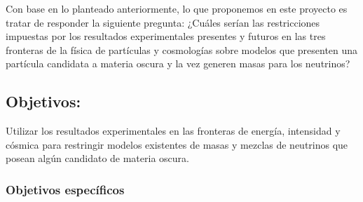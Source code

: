 Con base en lo planteado anteriormente, lo que proponemos en este
proyecto es tratar de responder la siguiente pregunta: ¿Cuáles serían
las restricciones impuestas por los resultados experimentales
presentes y futuros en las tres fronteras de la física de partículas y
cosmologías sobre modelos que presenten una partícula candidata a
materia oscura y la vez generen masas para los neutrinos?
 

\subsection{Objetivos:                                     }
Utilizar los resultados experimentales en las fronteras de energía,
intensidad y cósmica para restringir modelos existentes de masas y
mezclas de neutrinos que posean algún candidato de materia oscura.

\subsubsection{Objetivos específicos}
\label{sec:objet-espec}

